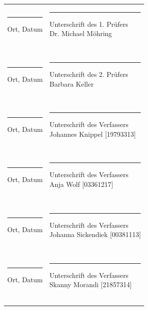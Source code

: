 \begin{flushleft}
\begin{tabular}[H]{ll}
		\parbox{7cm}{\hrule\medskip Ort, Datum\\ [0.3cm]}	&	\parbox{7cm}{\hrule\medskip Unterschrift des 1. Prüfers\\ [0.2cm]Dr. Michael Möhring}\\[1.5cm]
		\\
		\\
		\\
		\parbox{7cm}{\hrule\medskip Ort, Datum\\ [0.31cm]}	&	\parbox{7cm}{\hrule\medskip Unterschrift des 2. Prüfers\\ [0.2cm]Barbara Keller}\\[1.5cm]
		\\
		\\
		\\
		\parbox{7cm}{\hrule\medskip Ort, Datum\\ [0.33cm]}	&	\parbox{7cm}{\hrule\medskip Unterschrift des Verfassers\\ [0.2cm]Johannes Knippel [19793313]}\\[1.5cm]
		\\
		\\
		\\
		\parbox{7cm}{\hrule\medskip Ort, Datum\\ [0.33cm]}	&	\parbox{7cm}{\hrule\medskip Unterschrift des Verfassers\\ [0.2cm]Anja Wolf [03361217]}\\[1.5cm]
		\\
		\\
		\\
		\parbox{7cm}{\hrule\medskip Ort, Datum\\ [0.33cm]}	&	\parbox{7cm}{\hrule\medskip Unterschrift des Verfassers\\ [0.2cm]Johanna Sickendiek [00381113]}\\[1.5cm]
		\\
		\\
		\\
		\parbox{7cm}{\hrule\medskip Ort, Datum\\ [0.33cm]}	&	\parbox{7cm}{\hrule\medskip Unterschrift des Verfassers\\ [0.2cm]Skanny Morandi [21857314]}\\[1.5cm]
		\\
		\\
		\\
	\end{tabular}
\end{flushleft}

	
	
	

